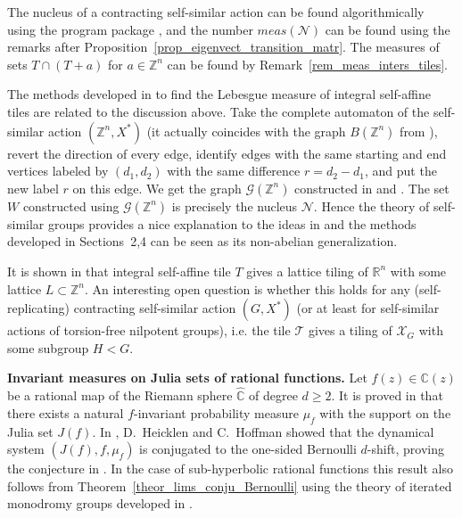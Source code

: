 \documentclass[12pt]{article}
\newcommand{\Z}{\mathbb{Z}}
\newcommand{\Rs}{\hat{\mathbb{C}}}
\newcommand{\limGs}[1][G]{\mathcal{X}_{#1}}
\newcommand{\mgr}{meas}
\newcommand{\tile}{\mathscr{T}}
\newcommand{\nucl}{\mathcal{N}}
\theoremstyle{definition}
\newtheorem{example}{Example}
\begin{document}
The nucleus of a contracting self-similar action can be found algorithmically using the program
package \cite{AutomGrp}, and the number $\mgr(\nucl)$ can be found using the remarks after
Proposition~\ref{prop_eigenvect_transition_matr}. The measures of sets $T\cap (T+a)$ for
$a\in\mathbb{Z}^n$ can be found by Remark~\ref{rem_meas_inters_tiles}.







The methods developed in \cite{gab_yu:natur_til} to find the Lebesgue measure of integral
self-affine tiles are related to the discussion above. Take the complete automaton
\cite[page~11]{self_sim_groups} of the self-similar action $(\Z^n,X^{*})$ (it actually coincides
with the graph $B(\Z^n)$ from \cite{canon_numsys}), revert the direction of every edge, identify
edges with the same starting and end vertices labeled by $(d_1,d_2)$ with the same difference
$r=d_2-d_1$, and put the new label $r$ on this edge. We get the graph $\mathcal{G}(\Z^n)$
constructed in \cite{gab_yu:natur_til} and \cite{fract_numsys}. The set $W$ constructed using
$\mathcal{G}(\Z^n)$ \cite[page~195]{gab_yu:natur_til} is precisely the nucleus $\nucl$. Hence the
theory of self-similar groups provides a nice explanation to the ideas in
\cite[Section~3]{gab_yu:natur_til} and the methods developed in Sections~2,4 can be seen as its
non-abelian generalization.

It is shown in \cite{lag_wang:int_self_affine_II} that integral self-affine tile $T$ gives a
lattice tiling  of $\mathbb{R}^n$ with some lattice $L\subset\Z^n$. An interesting open question is
whether this holds for any (self-replicating) contracting self-similar action $(G,X^{*})$ (or at
least for self-similar actions of torsion-free nilpotent groups), i.e. the tile $\tile$ gives a
tiling of $\limGs$ with some subgroup $H< G$.



\vspace{0.3cm}\noindent\textbf{Invariant measures on Julia sets of rational functions.} Let
$f(z)\in\mathbb{C}(z)$ be a rational map of the Riemann sphere $\Rs$ of degree $d\geq 2$. It is
proved in \cite{invmeas_rat} that there exists a natural $f$-invariant probability measure $\mu_f$
with the support on the Julia set $J(f)$. In \cite{rational_bernoulli}, D.~Heicklen and C.~Hoffman
showed that the dynamical system $(J(f),f,\mu_f)$ is conjugated to the one-sided Bernoulli
$d$-shift, proving the conjecture in \cite{invmeas_rat,lub:entr_ration}. In the case of
sub-hyperbolic rational functions this result also follows from
Theorem~\ref{theor_lims_conju_Bernoulli} using the theory of iterated monodromy groups developed in
\cite{self_sim_groups}.
\end{document}
